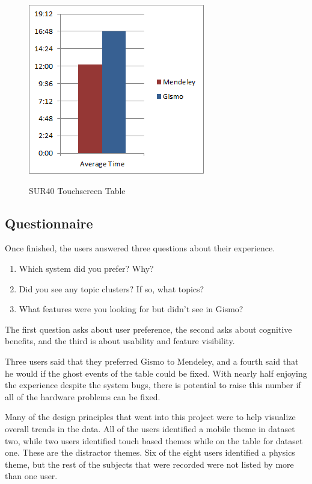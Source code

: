 \documentclass{article}
\begin{document}
\begin{figure}[ht!]
\centering
\scalebox{1}
{\includegraphics{BarChartSquare.png}}
\caption{SUR40 Touchscreen Table}
\label{Fig:barChart}
\end{figure}



\subsection*{Questionnaire}
Once finished, the users answered three questions about their experience.  
	\begin{enumerate}
	\item Which system did you prefer? Why?
	\item Did you see any topic clusters?  If so, what topics?
	\item What features were you looking for but didn't see in Gismo?
	\end{enumerate}

The first question asks about user preference, the second asks about cognitive benefits, and the third is  about usability and feature visibility.  

	Three users said that they preferred Gismo to Mendeley, and a fourth said that he would if the ghost events of the table could be fixed.  With nearly half enjoying the experience despite the system bugs, there is potential to raise this number if all of the hardware problems can be fixed.  
	
	Many of the design principles that went into this project were to help visualize overall trends in the data.  All of the users identified a mobile theme in dataset two, while two users identified touch based themes while on the table for dataset one.    These are the distractor themes.  Six of the eight users identified a physics theme, but the rest of the subjects that were recorded were not listed by more than one user.  
	
\end{document}
